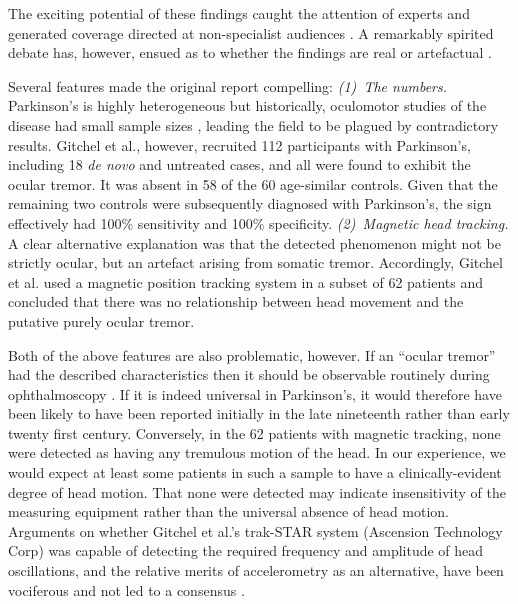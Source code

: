 \documentclass[jou,a4paper]{apa6}
\begin{document}
The exciting potential of these findings caught the attention of experts \citep{Leigh2013Tremor-of-the-e, Willard2014Ocular-motor-di, Bronstein2014EYEE:-exciting-} and generated coverage directed at non-specialist audiences \citep{In-Brief2012Ocular-Tremor-i,Phend2012Eye-tremors-may}. A remarkably spirited debate has, however, ensued as to whether the findings are real \citep{Baron2013Ocular-tremor-i,Baron2014Scientific-data,Duval2013Ocular-tremor-i,Gitchel2014Experimental-su} or artefactual \citep{Kaski2013Eye-oscillation,Kaski2013Ocular-tremor-i,MacAskill2013Ocular-tremor-i,Saifee2014Tremor-of-the-e}. 

Several features made the original report compelling: \textit{(1)~The numbers.} Parkinson's is highly heterogeneous but historically, oculomotor studies of the disease had small sample sizes \citep{Anderson2013Eye-movements-i}, leading the field to be plagued by contradictory results.  Gitchel et al., however, recruited 112 participants with Parkinson's, including 18 \textit{de novo} and untreated cases, and all were found to exhibit the ocular tremor. It was absent in 58 of the 60 age-similar controls. Given that the remaining two controls were subsequently diagnosed with Parkinson's, the sign effectively had 100\% sensitivity and 100\% specificity. \textit{(2)~Magnetic head tracking.} A clear alternative explanation was that the detected phenomenon might not be strictly ocular, but an artefact arising from somatic tremor. Accordingly, Gitchel et al. used a magnetic position tracking system in a subset of 62 patients and concluded that there was no relationship between head movement and the putative purely ocular tremor.

Both of the above features are also problematic, however. If an ``ocular tremor'' had the described characteristics then it should be observable routinely during ophthalmoscopy \citep{Leigh2013Tremor-of-the-e}. If it is indeed universal in Parkinson's, it would therefore have been likely to have been reported initially in the late nineteenth rather than early twenty first century. Conversely, in the 62 patients with magnetic tracking, none were detected as having any tremulous motion of the head. In our experience, we would expect at least some patients in such a sample to have a clinically-evident degree of head motion. That none were detected may indicate insensitivity of the measuring equipment rather than the universal absence of head motion. Arguments on whether Gitchel et al.'s trak-STAR system (Ascension Technology Corp) was capable of detecting the required frequency and amplitude of head oscillations, and the relative merits of accelerometry as an alternative, have been vociferous and not led to a consensus \citep{MacAskill2013Ocular-tremor-i,Saifee2014Tremor-of-the-e,Kaski2013Eye-oscillation,Baron2013Ocular-tremor-i,Baron2014Scientific-data,Gitchel2014Experimental-su}. 
\end{document}
